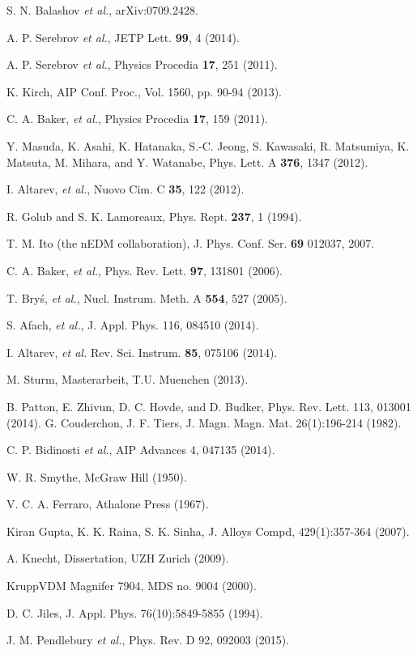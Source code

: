 \documentclass[review]{elsarticle}
\begin{document}

\begin{thebibliography}{00}

 S. N. Balashov {\it et al.}, arXiv:0709.2428.

 A. P. Serebrov {\it et al.}, JETP Lett. {\bf 99}, 4
  (2014).

 A. P. Serebrov {\it et al.}, Physics Procedia {\bf
  17}, 251 (2011).

 K. Kirch, AIP Conf. Proc., Vol. 1560, pp. 90-94
  (2013).

 C. A. Baker, {\it et al.}, Physics Procedia {\bf
  17}, 159 (2011).

 Y. Masuda, K. Asahi, K. Hatanaka, S.-C. Jeong,
  S. Kawasaki, R. Matsumiya, K. Matsuta, M. Mihara, and Y. Watanabe,
  Phys. Lett. A {\bf 376}, 1347 (2012).

 I. Altarev, {\it et al.}, Nuovo Cim. C {\bf
  35}, 122 (2012).

 R. Golub and S. K. Lamoreaux, Phys. Rept.  {\bf
  237}, 1 (1994).

 T. M. Ito (the nEDM collaboration),
  J. Phys. Conf. Ser. {\bf 69} 012037, 2007.

 C. A. Baker, {\it et al.}, Phys. Rev. Lett. {\bf
  97}, 131801 (2006).

 T. Bry\'s, {\it et al.}, Nucl. Instrum. Meth. A
  {\bf 554}, 527 (2005).

 S. Afach, {\it et al.}, J. Appl. Phys. 116, 084510 (2014).

 I. Altarev, {\it et al.}
  Rev. Sci. Instrum. {\bf 85}, 075106 (2014).

 M. Sturm, Masterarbeit, T.U. Muenchen (2013).

 B. Patton, E. Zhivun, D. C. Hovde, and D. Budker,
  Phys. Rev. Lett. 113, 013001 (2014).
 G. Couderchon, J. F. Tiers, J. Magn. Magn. Mat. 26(1):196-214 (1982).

 C. P. Bidinosti {\it et al.}, AIP Advances 4, 047135 (2014).

 W. R. Smythe, McGraw Hill (1950).

 V. C. A. Ferraro, Athalone Press (1967).

 Kiran Gupta, K. K. Raina, S. K. Sinha, J. Alloys Compd, 429(1):357-364 (2007).

 A. Knecht, Dissertation, UZH Zurich (2009).

 KruppVDM Magnifer 7904, MDS no. 9004 (2000).

 D. C. Jiles, J. Appl. Phys. 76(10):5849-5855 (1994).

 J. M. Pendlebury {\it et al.}, Phys. Rev. D 92, 092003 (2015).
\end{thebibliography}
\end{document}
